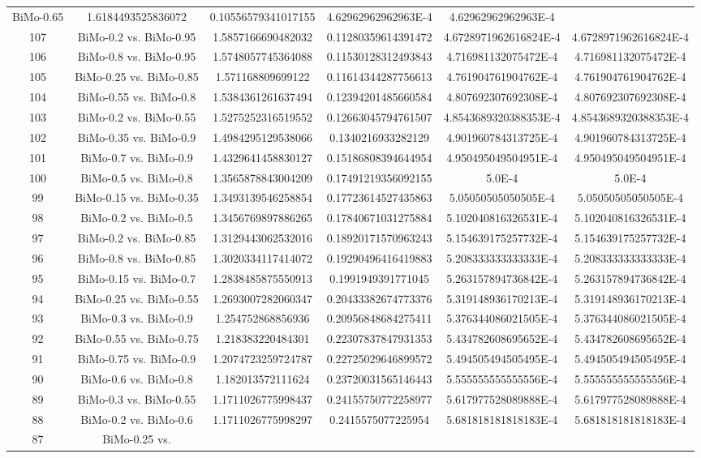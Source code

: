 \documentclass[a4paper,10pt]{article}
\begin{document}
\begin{landscape}
\begin{table}[!htp]
\begin{tabular}{cccccc}
BiMo-0.65&1.6184493525836072&0.10556579341017155&4.62962962962963E-4&4.62962962962963E-4\\107&BiMo-0.2 vs. BiMo-0.95&1.5857166690482032&0.11280359614391472&4.6728971962616824E-4&4.6728971962616824E-4\\106&BiMo-0.8 vs. BiMo-0.95&1.5748057745364088&0.11530128312493843&4.716981132075472E-4&4.716981132075472E-4\\105&BiMo-0.25 vs. BiMo-0.85&1.571168809699122&0.11614344287756613&4.761904761904762E-4&4.761904761904762E-4\\104&BiMo-0.55 vs. BiMo-0.8&1.5384361261637494&0.12394201485660584&4.807692307692308E-4&4.807692307692308E-4\\103&BiMo-0.2 vs. BiMo-0.55&1.5275252316519552&0.12663045794761507&4.8543689320388353E-4&4.8543689320388353E-4\\102&BiMo-0.35 vs. BiMo-0.9&1.4984295129538066&0.1340216933282129&4.901960784313725E-4&4.901960784313725E-4\\101&BiMo-0.7 vs. BiMo-0.9&1.4329641458830127&0.15186808394644954&4.950495049504951E-4&4.950495049504951E-4\\100&BiMo-0.5 vs. BiMo-0.8&1.3565878843004209&0.17491219356092155&5.0E-4&5.0E-4\\99&BiMo-0.15 vs. BiMo-0.35&1.3493139546258854&0.17723614527435863&5.05050505050505E-4&5.05050505050505E-4\\98&BiMo-0.2 vs. BiMo-0.5&1.3456769897886265&0.17840671031275884&5.102040816326531E-4&5.102040816326531E-4\\97&BiMo-0.2 vs. BiMo-0.85&1.3129443062532016&0.18920171570963243&5.154639175257732E-4&5.154639175257732E-4\\96&BiMo-0.8 vs. BiMo-0.85&1.3020334117414072&0.19290496416419883&5.208333333333333E-4&5.208333333333333E-4\\95&BiMo-0.15 vs. BiMo-0.7&1.2838485875550913&0.1991949391771045&5.263157894736842E-4&5.263157894736842E-4\\94&BiMo-0.25 vs. BiMo-0.55&1.2693007282060347&0.20433382674773376&5.319148936170213E-4&5.319148936170213E-4\\93&BiMo-0.3 vs. BiMo-0.9&1.254752868856936&0.20956848684275411&5.376344086021505E-4&5.376344086021505E-4\\92&BiMo-0.55 vs. BiMo-0.75&1.218383220484301&0.22307837847931353&5.434782608695652E-4&5.434782608695652E-4\\91&BiMo-0.75 vs. BiMo-0.9&1.2074723259724787&0.22725029646899572&5.494505494505495E-4&5.494505494505495E-4\\90&BiMo-0.6 vs. BiMo-0.8&1.182013572111624&0.23720031565146443&5.555555555555556E-4&5.555555555555556E-4\\89&BiMo-0.3 vs. BiMo-0.55&1.1711026775998437&0.24155750772258977&5.617977528089888E-4&5.617977528089888E-4\\88&BiMo-0.2 vs. BiMo-0.6&1.1711026775998297&0.2415575077225954&5.681818181818183E-4&5.681818181818183E-4\\87&BiMo-0.25 vs. 
\end{tabular}
\end{table}
\end{landscape}
\end{document}
